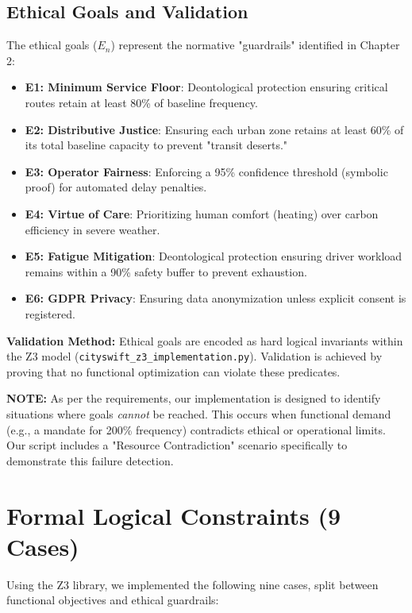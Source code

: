 \documentclass[]
{UCD_CS_41820_Report}
\begin{document}
\subsection{Ethical Goals and Validation}
The ethical goals ($E_{n}$) represent the normative "guardrails" identified in Chapter 2:
\begin{itemize}
  \item \textbf{E1: Minimum Service Floor}: Deontological protection ensuring critical routes retain at least 80\% of baseline frequency.
  \item \textbf{E2: Distributive Justice}: Ensuring each urban zone retains at least 60\% of its total baseline capacity to prevent "transit deserts."
  \item \textbf{E3: Operator Fairness}: Enforcing a 95\% confidence threshold (symbolic proof) for automated delay penalties.
  \item \textbf{E4: Virtue of Care}: Prioritizing human comfort (heating) over carbon efficiency in severe weather.
  \item \textbf{E5: Fatigue Mitigation}: Deontological protection ensuring driver workload remains within a 90\% safety buffer to prevent exhaustion.
  \item \textbf{E6: GDPR Privacy}: Ensuring data anonymization unless explicit consent is registered.
\end{itemize}
\textbf{Validation Method:} Ethical goals are encoded as hard logical invariants within the Z3 model (\texttt{cityswift\_z3\_implementation.py}). Validation is achieved by proving that no functional optimization can violate these predicates.

\textbf{NOTE:} As per the requirements, our implementation is designed to identify situations where goals \textit{cannot} be reached. This occurs when functional demand (e.g., a mandate for 200\% frequency) contradicts ethical or operational limits. Our script includes a "Resource Contradiction" scenario specifically to demonstrate this failure detection.

\section{Formal Logical Constraints (9 Cases)}

Using the Z3 library, we implemented the following nine cases, split between functional objectives and ethical guardrails:
\end{document}
